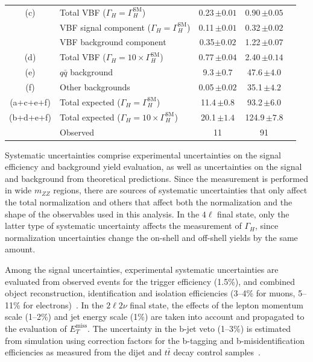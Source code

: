 \begin{table}
\begin{tabular}{clccc}
\hline
(c)& Total VBF ($\Gamma_{H} = \Gamma_{H}^{\mathrm{SM}}$)         & 0.23\,$\pm 0.01$    & 0.90\,$\pm 0.05$ & \\
 & VBF signal component ($\Gamma_{H} = \Gamma_{H}^{\mathrm{SM}}$)          & 0.11\,$\pm 0.01$    & 0.32\,$\pm 0.02$ & \\
 & VBF background component                                                  & 0.35$\pm 0.02$      & 1.22\,$\pm 0.07$ & \\
(d)& Total VBF ($\Gamma_{H} = 10 \times \Gamma_{H}^{\mathrm{SM}}$)        & 0.77\,$\pm 0.04$  & 2.40\,$\pm 0.14$ & \\
\hline
(e)& $q\bar{q}$ background                      & 9.3\,$\pm 0.7$    & 47.6\,$\pm 4.0$ & \\
(f)& Other backgrounds                                             & 0.05\,$\pm 0.02$    & 35.1\,$\pm 4.2$ & \\
\hline
(a+c+e+f)& Total expected ($\Gamma_{H} = \Gamma_{H}^{\mathrm{SM}}$)       & 11.4\,$\pm 0.8$ & 93.2\,$\pm 6.0$ & \\
(b+d+e+f)& Total expected ($\Gamma_{H} = 10 \times \Gamma_{H}^{\mathrm{SM}}$) & 20.1\,$\pm1.4$  & 124.9\,$\pm 7.8$ & \\
\hline
& Observed                                                         & 11                & 91 & \\
\hline
\hline
\end{tabular}
\label{tab:yields}
\end{table}

Systematic uncertainties comprise experimental uncertainties on the signal efficiency and
background yield evaluation, as well as uncertainties on the signal and background from
theoretical predictions. Since the measurement is performed in wide $m_{ZZ}$ regions, there
are sources of systematic uncertainties that only affect the total normalization and
others that affect both the normalization and the shape of the observables used in this
analysis. In the $4\ell$ final state, only the latter type of systematic uncertainty
affects the measurement of $\Gamma_{H}$, since normalization uncertainties change the on-shell
and off-shell yields by the same amount.

Among the signal uncertainties, experimental systematic uncertainties are evaluated
from observed events for the trigger efficiency (1.5\%), and combined object reconstruction,
identification and isolation efficiencies (3--4\% for muons, 5--11\% for electrons)~\cite{Chatrchyan:2013mxa}.
In the $2\ell 2\nu$ final state, the effects of the lepton momentum scale (1--2\%) and jet
energy scale (1\%) are taken into account and propagated to the evaluation of $E_{T}^{\text{miss}}$.
The uncertainty in the b-jet veto (1--3\%) is estimated from simulation using
correction factors for the b-tagging and b-misidentification efficiencies as measured
from the dijet and $t\bar{t}$ decay control samples~\cite{Chatrchyan:2012jua}.

